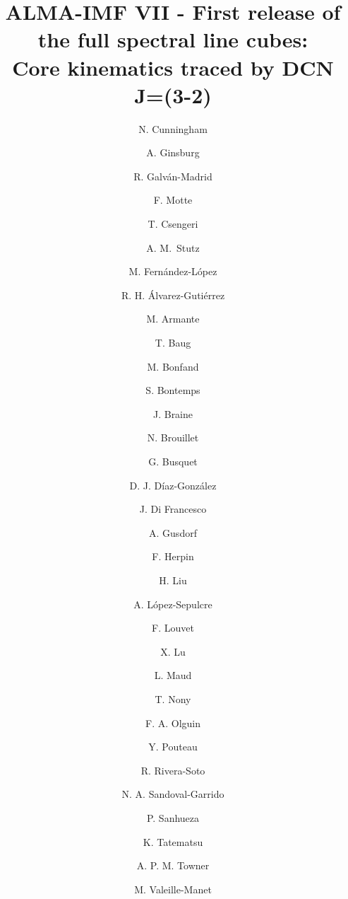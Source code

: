 \documentclass[longauth]{aa} %
\begin{document}
\title{ALMA-IMF VII - First release of the full spectral line cubes:\\Core kinematics traced by DCN J=(3-2)}
\author{N. Cunningham\and 
A. Ginsburg\and 
R. Galv\'an-Madrid\and 
F. Motte\and 
T. Csengeri\and 
A. M.\ Stutz\and
M. Fern\'andez-L\'opez\and 
R. H. Álvarez-Gutiérrez\and
M. Armante\and 
T. Baug\and 
M. Bonfand\and 
S. Bontemps\and 
J. Braine\and 
N. Brouillet\and 
G. Busquet\and 
D. J. D\'iaz-Gonz\'alez\and 
J. Di Francesco\and
A. Gusdorf\and 
F. Herpin\and 
H. Liu\and 
A. L\'opez-Sepulcre\and 
F. Louvet\and 
X. Lu\and 
L. Maud\and 
T. Nony\and 
F. A. Olguin\and 
Y. Pouteau\and 
R. Rivera-Soto\and 
N. A. Sandoval-Garrido\and
P. Sanhueza\and 
K. Tatematsu\and 
A. P. M. Towner\and
M. Valeille-Manet}
\end{document}
